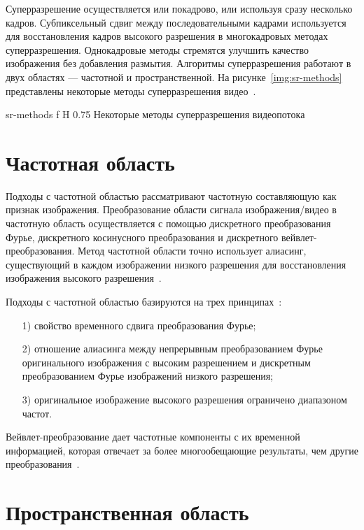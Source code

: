 \documentclass{bmstu}
\begin{document}
Суперразрешение осуществляется или покадрово, или используя сразу несколько кадров. 
Субпиксельный сдвиг между последовательными кадрами используется для восстановления кадров высокого разрешения в многокадровых методах суперразрешения. 
Однокадровые методы стремятся улучшить качество изображения без добавления размытия. 
Алгоритмы суперразрешения работают в двух областях --- частотной и пространственной. 
На рисунке~\ref{img:sr-methods} представлены некоторые методы суперразрешения видео~\cite{Daithankar2021}.

    {sr-methods}
    {f}
    {H}
    {0.75\textwidth}
    {Некоторые методы суперразрешения видеопотока~\cite{Daithankar2021}}

\section{Частотная область}

Подходы с частотной областью рассматривают частотную составляющую как признак изображения. 
Преобразование области сигнала изображения/видео в частотную область осуществляется с помощью дискретного преобразования Фурье, дискретного косинусного преобразования и дискретного вейвлет-преобразования. 
Метод частотной области точно использует алиасинг, существующий в каждом изображении низкого разрешения для восстановления изображения высокого разрешения~\cite{Daithankar2021}.

Подходы с частотной областью базируются на трех принципах~\cite{Thapa2016}:
\begin{enumerate}
\item[1)] свойство временного сдвига преобразования Фурье;
\item[2)] отношение алиасинга между непрерывным преобразованием Фурье оригинального изображения с высоким разрешением и дискретным преобразованием Фурье изображений низкого разрешения;
\item[3)] оригинальное изображение высокого разрешения ограничено диапазоном частот.
\end{enumerate}

Вейвлет-преобразование дает частотные компоненты с их временной информацией, которая отвечает за более многообещающие результаты, чем другие преобразования~\cite{Daithankar2021}.

\section{Пространственная область}
\end{document}

